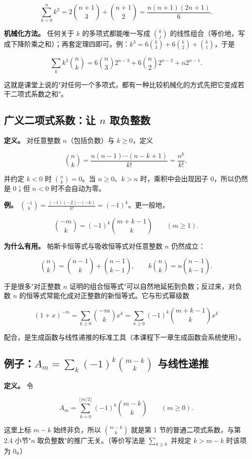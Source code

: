 \[
\sum_{k=0}^{n}k^2=2\binom{n+1}{3}+\binom{n+1}{2}=\frac{n(n+1)(2n+1)}{6}.
\]

\textbf{机械化方法。} 任何关于 $k$ 的多项式都能唯一写成 $\binom kj$ 的线性组合（等价地，写成下降阶乘之和）；再套定理四即可。例：$k^3=6\binom k3+6\binom k2+\binom k1$，于是

\[
\sum_k k^3\binom nk=6\binom n3 2^{n-3}+6\binom n2 2^{n-2}+n2^{n-1}.
\]

这就是课堂上说的"对任何一个多项式，都有一种比较机械化的方式先把它变成若干二项式系数之和"。

\subsection{广义二项式系数：让 $n$ 取负整数}


\textbf{定义。} 对任意整数 $n$（包括负数）与 $k\ge0$，定义

\[
\binom nk=\frac{n(n-1)\cdots(n-k+1)}{k!}=\frac{n^{\underline{k}}}{k!},
\]

并约定 $k<0$ 时 $\binom nk=0$。当 $n\ge0$、$k>n$ 时，乘积中会出现因子 $0$，所以仍然是 $0$；但 $n<0$ 时不会自动为零。

\textbf{例。} $\binom{-1}{k}=\frac{(-1)(-2)\cdots(-k)}{k!}=(-1)^k$。更一般地，

\[
\binom{-m}{k}=(-1)^k\binom{m+k-1}{k}\qquad(m\ge1).
\]

\textbf{为什么有用。} 帕斯卡恒等式与吸收恒等式对任意整数 $n$ 仍然成立：

\[
\binom nk=\binom{n-1}{k}+\binom{n-1}{k-1},\qquad k\binom nk=n\binom{n-1}{k-1}.
\]

于是很多"对正整数 $n$ 证明的组合恒等式"可以自然地延拓到负数；反过来，对负数 $n$ 的恒等式常能化成对正整数的新恒等式。它与形式幂级数

\[
(1+x)^{-m}=\sum_{k\ge0}\binom{-m}{k}x^k=\sum_{k\ge0}(-1)^k\binom{m+k-1}{k}x^k
\]

配合，是生成函数与线性递推的标准工具（本课程下一章生成函数会系统使用）。

\subsection{例子：$A_m=\sum_k(-1)^k\binom{m-k}{k}$ 与线性递推}


\textbf{定义。} 令

\[
A_m=\sum_{k=0}^{\lfloor m/2\rfloor}(-1)^k\binom{m-k}{k}\qquad(m\ge0).
\]

这里上标 $m-k$ 始终非负，所以 $\binom{m-k}{k}$ 就是第 1 节的普通二项式系数，与第 2.4 小节"$n$ 取负整数"的推广无关。（等价写法是 $\sum_{k\ge0}$ 并规定 $k>m-k$ 时该项为 $0$。）

